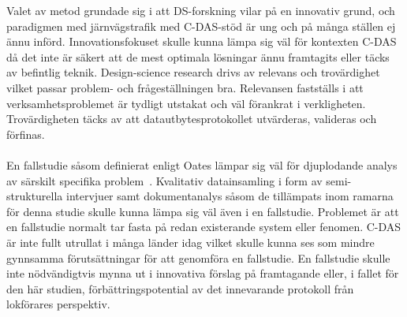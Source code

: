 Valet av metod grundade sig i att DS-forskning vilar på en innovativ grund, och paradigmen med järnvägstrafik med C-DAS-stöd är ung och på många ställen ej ännu införd.
Innovationsfokuset skulle kunna lämpa sig väl för kontexten C-DAS då det inte är säkert att de mest optimala lösningar ännu framtagits eller täcks av befintlig teknik.
Design-science research drivs av relevans och trovärdighet vilket passar problem- och frågeställningen bra.
Relevansen fastställs i att verksamhetsproblemet är tydligt utstakat och väl förankrat i verkligheten.
Trovärdigheten täcks av att datautbytesprotokollet utvärderas, valideras och förfinas.
\paragraph{}
\hspace{-14pt}
En fallstudie såsom definierat enligt Oates lämpar sig väl för djuplodande analys av särskilt specifika problem~\cite{Oates2005}.
Kvalitativ datainsamling i form av semi-strukturella intervjuer samt dokumentanalys såsom de tillämpats inom ramarna för denna studie skulle kunna lämpa sig väl även i en fallstudie.
Problemet är att en fallstudie normalt tar fasta på redan existerande system eller fenomen.
C-DAS är inte fullt utrullat i många länder idag vilket skulle kunna ses som mindre gynnsamma förutsättningar för att genomföra en fallstudie.
En fallstudie skulle inte nödvändigtvis mynna ut i innovativa förslag på framtagande eller, i fallet för den här studien, förbättringspotential av det innevarande protokoll från lokförares perspektiv.

